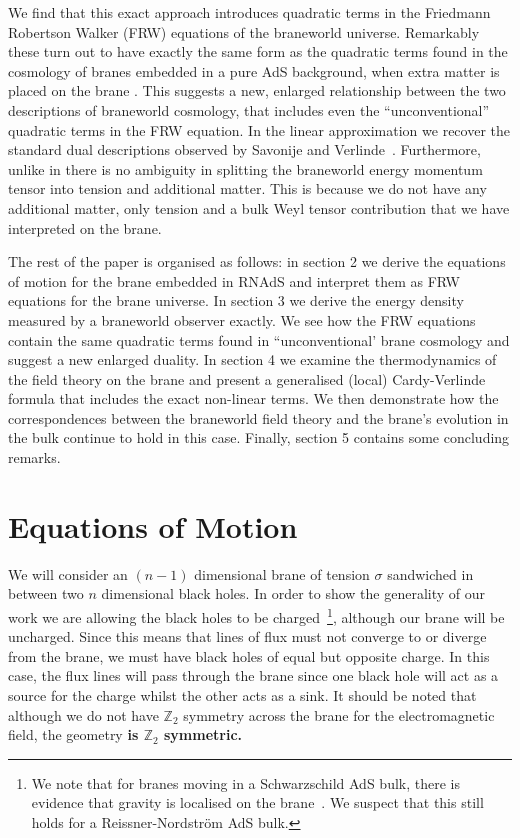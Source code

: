 \documentclass[a4paper,12pt]{article}
\begin{document}
We find that this exact approach introduces quadratic terms in the
Friedmann Robertson Walker (FRW) equations of the braneworld
universe. Remarkably these turn out to have exactly the same form as
the quadratic terms found in the cosmology of branes embedded in a
pure AdS background, when extra matter is placed on the brane
\cite{Binetruy:branecos1,Binetruy:branecos2}. This suggests a new,
enlarged relationship between the two descriptions of braneworld
cosmology, that includes even the ``unconventional'' quadratic terms
in the FRW equation.  In the linear approximation we recover the
standard dual descriptions observed by Savonije and
Verlinde~\cite{Verlinde:radiation,Savonije:braneCFT}.  Furthermore,
unlike in \cite{Binetruy:branecos1,Binetruy:branecos2} there is no
ambiguity in splitting the braneworld energy momentum tensor into
tension and additional matter. This is because we do not have any
additional matter, only tension and a bulk Weyl tensor contribution
that we have interpreted on the brane.

The rest of the paper is organised as follows: in section 2 we derive
the equations of motion for the brane embedded in RNAdS and interpret
them as FRW equations for the brane universe. In section 3 we derive
the energy density measured by a braneworld observer exactly. We see
how the FRW equations contain the same quadratic terms found in
``unconventional' brane cosmology and suggest a new enlarged
duality. In section 4 we examine the thermodynamics of the field
theory on the brane and present a generalised (local) Cardy-Verlinde
formula that includes the exact non-linear terms. We then demonstrate
how the correspondences between the braneworld field theory and the
brane's evolution in the bulk continue to hold in this case. Finally,
section 5 contains some concluding remarks.

\section{Equations of Motion} \label{section:eom}

We will consider an $(n-1)$ dimensional brane of tension $\sigma$
sandwiched in between two $n$ dimensional black holes. In order to
show the generality of our work we are allowing the black holes to be
charged~\footnote{We note that for branes moving in a Schwarzschild
AdS bulk, there is evidence that gravity is localised on the
brane~\cite{Singh:local}.  We suspect that this still holds for a
Reissner-Nordstr\"om AdS bulk.}, although our brane will be
uncharged. Since this means that lines of flux must not converge to or
diverge from the brane, we must have black holes of equal but opposite
charge. In this case, the flux lines will pass through the brane since
one black hole will act as a source for the charge whilst the other
acts as a sink. It should be noted that although we do not have
$\mathbb{Z}_2$ symmetry across the brane for the electromagnetic
field, the geometry \bf{is} \rm $\mathbb{Z}_2$ symmetric.
\end{document}
